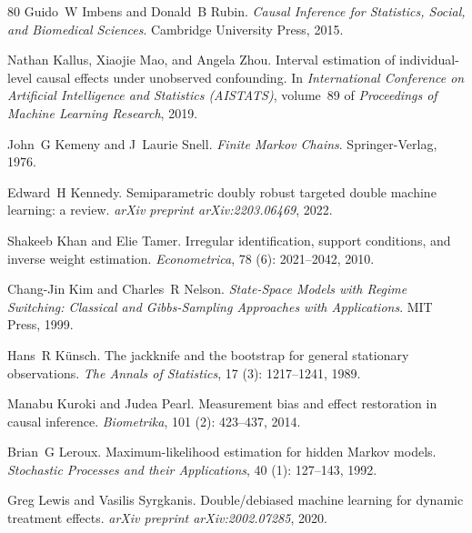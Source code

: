 \begin{thebibliography}{80}
Guido~W Imbens and Donald~B Rubin.
\newblock \emph{Causal Inference for Statistics, Social, and Biomedical Sciences}.
\newblock Cambridge University Press, 2015.

Nathan Kallus, Xiaojie Mao, and Angela Zhou.
\newblock Interval estimation of individual-level causal effects under unobserved confounding.
\newblock In \emph{International Conference on Artificial Intelligence and Statistics (AISTATS)}, volume~89 of \emph{Proceedings of Machine Learning Research}, 2019.

John~G Kemeny and J~Laurie Snell.
\newblock \emph{Finite Markov Chains}.
\newblock Springer-Verlag, 1976.

Edward~H Kennedy.
\newblock Semiparametric doubly robust targeted double machine learning: a review.
\newblock \emph{arXiv preprint arXiv:2203.06469}, 2022.

Shakeeb Khan and Elie Tamer.
\newblock Irregular identification, support conditions, and inverse weight estimation.
\newblock \emph{Econometrica}, 78 (6): 2021--2042, 2010.

Chang-Jin Kim and Charles~R Nelson.
\newblock \emph{State-Space Models with Regime Switching: Classical and Gibbs-Sampling Approaches with Applications}.
\newblock MIT Press, 1999.

Hans~R K{\"u}nsch.
\newblock The jackknife and the bootstrap for general stationary observations.
\newblock \emph{The Annals of Statistics}, 17 (3): 1217--1241, 1989.

Manabu Kuroki and Judea Pearl.
\newblock Measurement bias and effect restoration in causal inference.
\newblock \emph{Biometrika}, 101 (2): 423--437, 2014.

Brian~G Leroux.
\newblock Maximum-likelihood estimation for hidden {M}arkov models.
\newblock \emph{Stochastic Processes and their Applications}, 40 (1): 127--143, 1992.

Greg Lewis and Vasilis Syrgkanis.
\newblock Double/debiased machine learning for dynamic treatment effects.
\newblock \emph{arXiv preprint arXiv:2002.07285}, 2020.


\end{thebibliography}
